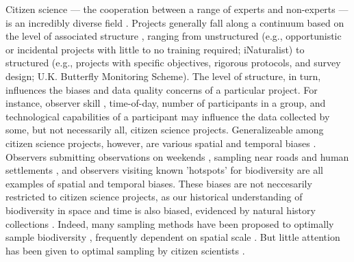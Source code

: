 \documentclass[9pt,twocolumn,twoside,lineno]{pnas-new}
\begin{document}
Citizen science --- the cooperation between a range of experts and non-experts  --- is an incredibly diverse field \cite{jordan2015citizen}. Projects generally fall along a continuum based on the level of associated structure \cite{kelling2019using, welvaert2016citizen}, ranging from unstructured (e.g., opportunistic or incidental projects with little to no training required; iNaturalist) to structured (e.g., projects with specific objectives, rigorous protocols, and survey design; U.K. Butterfly Monitoring Scheme). The level of structure, in turn, influences the biases and data quality concerns of a particular project. For instance, observer skill \cite{kelling2015can}, time-of-day, number of participants in a group, and technological capabilities of a participant may influence the data collected by some, but not necessarily all, citizen science projects. Generalizeable among citizen science projects, however, are various spatial and temporal biases \cite{boakes2010distorted, bird2014statistical}. Observers submitting observations on weekends \cite{courter2013weekend}, sampling near roads and human settlements \cite{kelling2015taking}, and observers visiting known 'hotspots' for biodiversity \cite{geldmann2016determines} are all examples of spatial and temporal biases. These biases are not neccesarily restricted to citizen science projects, as our historical understanding of biodiversity in space and time is also biased, evidenced by natural history collections \cite{pyke2010biological, boakes2010distorted}. Indeed, many sampling methods have been proposed to optimally sample biodiversity \cite{etienne2005new, moreno2000assessing, colwell1994estimating, longino1997biodiversity, ferrarini2012biodiversity}, frequently dependent on spatial scale \cite{chase2013scale}. But little attention has been given to optimal sampling by citizen scientists \cite{harrison2014assessing}.
\end{document}

